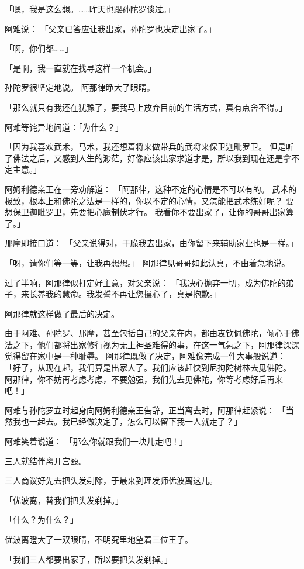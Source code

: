 \documentclass[twoside,openany]{book}
\begin{document}
「嗯，我是这么想。……昨天也跟孙陀罗谈过。」

阿难说：
「父亲已答应让我出家，孙陀罗也决定出家了。」

「啊，你们都……」

「是啊，我一直就在找寻这样一个机会。」

孙陀罗很坚定地说。
阿那律睁大了眼睛。

「那么就只有我还在犹豫了，要我马上放弃目前的生活方式，真有点舍不得。」

阿难等诧异地问道：「为什么？」

「因为我喜欢武术，马术，我还想着将来做带兵的武将来保卫迦毗罗卫。
但是听了佛法之后，又感到人生的渺茫，好像应该出家求道才是，所以我到现在还是拿不定主意。」

阿姆利德亲王在一旁劝解道：
「阿那律，这种不定的心情是不可以有的。
武术的极致，根本上和佛陀之法是一样的，你以不定的心情，又怎能把武术练好呢？
要想保卫迦毗罗卫，先要把心魔制伏才行。
我看你不要出家了，让你的哥哥出家算了。」

那摩即接口道：
「父亲说得对，干脆我去出家，由你留下来辅助家业也是一样。」

「呀，请你们等一等，让我再想想。」
阿那律见哥哥如此认真，不由着急地说。

过了半响，阿那律似打定好主意，对父亲说：
「我决心抛弃一切，成为佛陀的弟子，来长养我的慧命。我发誓不再让您操心了，真是抱歉。」

阿那律就这样做了最后的决定。

由于阿难、孙陀罗、那摩，甚至包括自己的父亲在内，都由衷钦佩佛陀，倾心于佛法之下，他们都将出家修行视为无上神圣难得的事，在这一气氛之下，阿那律深深觉得留在家中是一种耻辱。
阿那律既做了决定，阿难像完成一件大事般说道：
「好了，从现在起，我们算是出家人了。我们应该赶快到尼拘陀树林去见佛陀。
阿那律，你不妨再考虑考虑，不要勉强，我们先去见佛陀，你等考虑好后再来吧！」

阿难与孙陀罗立时起身向阿姆利德亲王告辞，正当离去时，阿那律赶紧说：
「当然我也一起去。我已经做决定了，怎么可以留下我一人就走了？」

阿难笑着说道：
「那么你就跟我们一块儿走吧！」

三人就结伴离开宫殹。

三人商议好先去把头发剃除，于最来到理发师优波离这儿。

「优波离，替我们把头发剃掉。」

「什么？为什么？」

优波离瞪大了一双眼睛，不明究里地望着三位王子。

「我们三人都要出家了，所以要把头发剃掉。」
\end{document}
